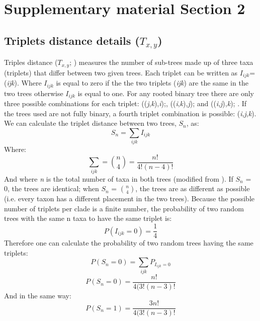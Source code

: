 \section{Supplementary material Section 2}

\subsection{Triplets distance details ($T_{x,y}$)}
Triples distance ($T_{x,y}$; \citealp{dobson1975triplets}) measures the number of sub-trees made up of three taxa (triplets) that differ between two given trees.
Each triplet can be written as $I_{ijk}$=(\textit{ijk}). Where $I_{ijk}$ is equal to zero if the the two triplets (\textit{ijk}) are the same in the two trees otherwise $I_{ijk}$ is equal to one.
For any rooted binary tree there are only three possible combinations for each triplet: ((\textit{j},\textit{k}),\textit{i});, ((\textit{i},\textit{k}),\textit{j}); and ((\textit{i},\textit{j}),\textit{k}); \citep{johnson1998}.
If the trees used are not fully binary, a fourth triplet combination is possible: (\textit{i},\textit{j},\textit{k}).
We can calculate the triplet distance between two trees, $S_n$, as:
\begin{equation}
S_n = \sum_{ijk} I_{ijk}
\end{equation}
Where:
\begin{equation}
\sum_{ijk} = \binom{n}{4} = \frac{n!}{4!(n-4)!}
\end{equation}
And where \textit{n} is the total number of taxa in both trees (modified from \citet{critchlowthe1996}).
If $S_n$ = 0, the trees are identical; when $S_n$ = $\binom{n}{4}$, the trees are as different as possible (i.e. every taxon has a different placement in the two trees).
Because the possible number of triplets per clade is a finite number, the probability of two random trees with the same n taxa to have the same triplet is:
\begin{equation}
P({I_{ijk}}=0) = \frac{1}{4}
\end{equation}
Therefore one can calculate the probability of two random trees having the same triplets: 
\begin{equation}
P({S_{n}}=0) = \sum_{ijk} P_{I_{ijk}=0}
\end{equation}
\begin{equation}
P({S_{n}}=0) = \frac{n!}{4(3!(n-3)!}
\end{equation}
And in the same way:
\begin{equation}
P({S_{n}}=1) = \frac{3n!}{4(3!(n-3)!}
\end{equation}

